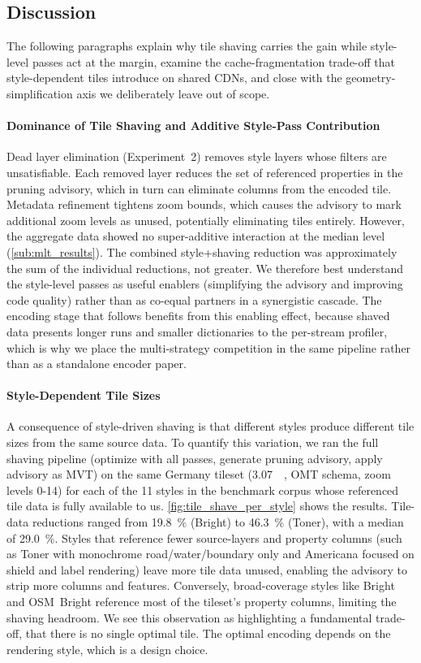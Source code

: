 \subsection{Discussion}\label{sub:mlt_discussion}

The following paragraphs explain why tile shaving carries the gain while style-level passes act at the margin, examine the cache-fragmentation trade-off that style-dependent tiles introduce on shared \acsp{CDN}, and close with the geometry-simplification axis we deliberately leave out of scope.

\paragraph{Dominance of Tile Shaving and Additive Style-Pass Contribution}
Dead layer elimination (Experiment~2) removes style layers whose filters are unsatisfiable.
Each removed layer reduces the set of referenced properties in the pruning advisory, which in turn can eliminate columns from the encoded tile.
Metadata refinement tightens zoom bounds, which causes the advisory to mark additional zoom levels as unused, potentially eliminating tiles entirely.
However, the aggregate data showed no super-additive interaction at the median level (\cref{sub:mlt_results}).
The combined style+shaving reduction was approximately the sum of the individual reductions, not greater.
We therefore best understand the style-level passes as useful enablers (simplifying the advisory and improving code quality) rather than as co-equal partners in a synergistic cascade.
The encoding stage that follows benefits from this enabling effect, because shaved data presents longer runs and smaller dictionaries to the per-stream profiler, which is why we place the multi-strategy competition in the same pipeline rather than as a standalone encoder paper.

\paragraph{Style-Dependent Tile Sizes}
A consequence of style-driven shaving is that different styles produce different tile sizes from the same source data.
To quantify this variation, we ran the full shaving pipeline (optimize with all passes, generate pruning advisory, apply advisory as \ac{MVT}) on the same Germany tileset (\qty{3.07}{\giga\byte}, \ac{OMT} schema, zoom levels 0-14) for each of the 11 styles in the benchmark corpus whose referenced tile data is fully available to us.
\cref{fig:tile_shave_per_style} shows the results.
Tile-data reductions ranged from \qty{19.8}{\percent} (Bright) to \qty{46.3}{\percent} (Toner), with a median of \qty{29.0}{\percent}.
Styles that reference fewer source-layers and property columns (such as Toner with monochrome road/water/boundary only and Americana focused on shield and label rendering) leave more tile data unused, enabling the advisory to strip more columns and features.
Conversely, broad-coverage styles like Bright and OSM~Bright reference most of the tileset's property columns, limiting the shaving headroom.
We see this observation as highlighting a fundamental trade-off, that there is no single optimal tile.
The optimal encoding depends on the rendering style, which is a design choice.

